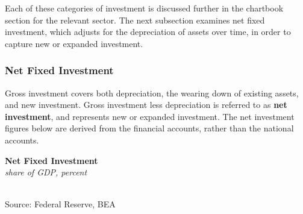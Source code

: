 \documentclass{report}
\makeatletter
\newcommand{\tbllink}[1]{\href{https://raw.githubusercontent.com/bdecon/US-chartbook/master/chartbook/data/#1}{\faTable}}
\newcommand*\short[1]{\expandafter\@gobbletwo\number\numexpr#1\relax}
\newcommand{\absnode}[3]{\node[below right, align=left] at (axis cs: #1,#2) {#3};}
\newcommand{\shdateaxisticks}{
		date coordinates in=x, axis line style={draw=none},
		xmax={2023-11-01},
		max space between ticks=40,	    
		xtick={{1990-01-01}, {1995-01-01}, {2000-01-01}, 
			{2005-01-01}, {2010-01-01}, {2015-01-01}, {2020-01-01}},
		minor xtick={},
		enlarge y limits={0.06}, enlarge x limits={0.01},
		}
\newcommand{\bbar}[2]{extra #1 ticks = {{#2}}, extra #1 tick labels = ,
		extra #1 tick style = {grid=major, grid style={thick, black!25}},}
\newcommand{\stdline}[4]{\addplot[very thick, no markers, color=#1] 
		table [x=#2, y=#3, col sep=comma] {#4};	}
\newcommand{\rbars}{
		\fill[color=black!10] (axis cs:{1990-07-01},\pgfkeysvalueof{/pgfplots/ymin}) rectangle 
			(axis cs:{1991-03-01}, \pgfkeysvalueof{/pgfplots/ymax});
		\fill[color=black!10] (axis cs:{2007-12-01},\pgfkeysvalueof{/pgfplots/ymin}) rectangle 
			(axis cs:{2009-07-01}, \pgfkeysvalueof{/pgfplots/ymax});
		\fill[color=black!10] (axis cs:{2001-03-01},\pgfkeysvalueof{/pgfplots/ymin}) rectangle 
			(axis cs:{2001-11-01}, \pgfkeysvalueof{/pgfplots/ymax});
		\fill[color=black!10] (axis cs:{2020-02-01},\pgfkeysvalueof{/pgfplots/ymin}) rectangle 
			(axis cs:{2020-05-01}, \pgfkeysvalueof{/pgfplots/ymax});}
\makeatother
\begin{document}
{\begin{minipage}{0.76\textwidth}
 

Each of these categories of investment is discussed further in the chartbook section for the relevant sector. The next subsection examines net fixed investment, which adjusts for the depreciation of assets over time, in order to capture new or expanded investment. 
\end{minipage}
\newpage
\vspace*{-9mm}

\begin{minipage}{0.76\textwidth}   
\subsubsection*{Net Fixed Investment}
\vspace{-1mm}
\small Gross investment covers both depreciation, the wearing down of existing assets, and new investment. Gross investment less depreciation is referred to as \textbf{net investment}, and represents new or expanded investment. The net investment figures below are derived from the financial accounts, rather than the national accounts. 

\begin{minipage}{0.445\textwidth}
\small 
\end{minipage} \hspace{5mm} \begin{minipage}{0.5\textwidth}
\normalsize \textbf{Net Fixed Investment}\\
\footnotesize{\textit{share of GDP, percent}}\\
\hspace*{-2mm} \\
\footnotesize{Source: Federal Reserve, BEA} \hfill \tbllink{z1_nfi.csv} \ \ 
\end{minipage}


\end{minipage}}
\end{document}
